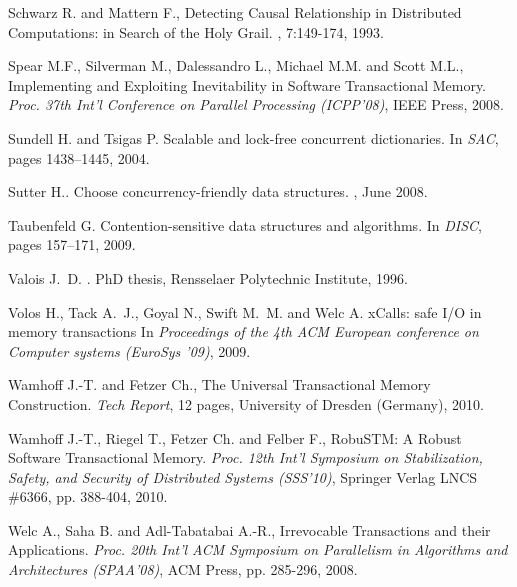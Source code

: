 \begin{thebibliography}{99}
{
Schwarz R. and Mattern F., 
\newblock Detecting  Causal Relationship in Distributed  Computations: in  Search of
the Holy Grail. 
, 7:149-174, 1993. 



Spear M.F., Silverman M., Dalessandro L., Michael M.M.  and Scott M.L., 
Implementing and Exploiting Inevitability in Software Transactional Memory.
{\it Proc. 37th Int'l Conference on Parallel Processing (ICPP'08)}, 
IEEE Press, 2008. 


Sundell H. and Tsigas P.
\newblock Scalable and lock-free concurrent dictionaries.
\newblock In {\em SAC}, pages 1438--1445, 2004.



Sutter H..
\newblock Choose concurrency-friendly data structures.
, June 2008.


Taubenfeld G.
\newblock Contention-sensitive data structures and algorithms.
\newblock In {\em DISC}, pages 157--171, 2009.




Valois J.~D.
.
\newblock PhD thesis, Rensselaer Polytechnic Institute, 1996.


Volos H., Tack A.~J., Goyal N., Swift M.~M. and Welc A.
\newblock xCalls: safe I/O in memory transactions
\newblock In {\em Proceedings of the 4th ACM European conference on Computer systems (EuroSys '09)}, 2009.


Wamhoff J.-T. and   Fetzer Ch., 
The Universal Transactional Memory Construction. 
{\it Tech Report}, 12 pages, University of Dresden (Germany), 2010. 
 

Wamhoff J.-T.,   Riegel T.,  Fetzer Ch. and  Felber F., 
RobuSTM: A Robust Software Transactional Memory.
{\it Proc. 12th Int'l Symposium on  Stabilization, Safety, and Security 
of Distributed Systems (SSS'10)}, 
Springer Verlag LNCS \#6366, pp.  388-404,  2010. 

Welc A., Saha B. and Adl-Tabatabai A.-R., 
Irrevocable Transactions and their Applications. 
{\it  Proc. 20th  Int'l  ACM Symposium on Parallelism in Algorithms 
and Architectures   (SPAA'08)},  ACM Press, pp. 285-296,  2008. 


}
\end{thebibliography}
